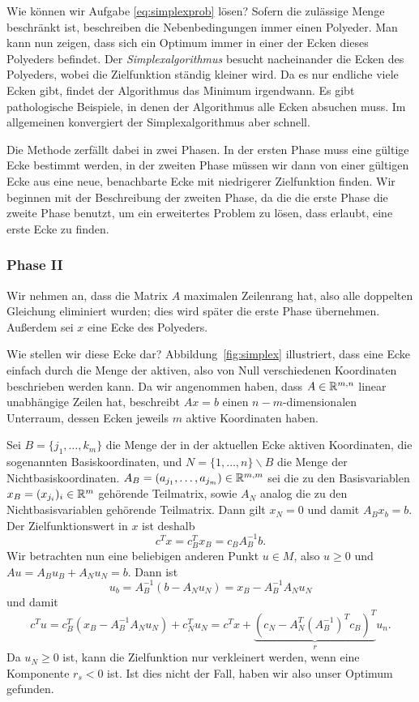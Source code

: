 Wie können wir Aufgabe \eqref{eq:simplexprob} lösen? Sofern die
zulässige Menge beschränkt ist, beschreiben die Nebenbedingungen immer
einen Polyeder. Man kann nun zeigen, dass sich ein Optimum immer in
einer der Ecken dieses Polyeders befindet. Der
\emph{Simplexalgorithmus} besucht nacheinander die Ecken des
Polyeders, wobei die Zielfunktion ständig kleiner wird. Da es nur
endliche viele Ecken gibt, findet der Algorithmus das Minimum
irgendwann. Es gibt pathologische Beispiele, in denen der Algorithmus
alle Ecken absuchen muss. Im allgemeinen konvergiert der
Simplexalgorithmus aber schnell.

Die Methode zerfällt dabei in zwei Phasen. In der ersten Phase muss
eine gültige Ecke bestimmt werden, in der zweiten Phase müssen wir
dann von einer gültigen Ecke aus eine neue, benachbarte Ecke mit
niedrigerer Zielfunktion finden. Wir beginnen mit der Beschreibung der
zweiten Phase, da die die erste Phase die zweite Phase benutzt, um ein
erweitertes Problem zu lösen, dass erlaubt, eine erste Ecke zu finden.

\subsubsection*{Phase II}

Wir nehmen an, dass die Matrix $A$ maximalen Zeilenrang hat, also alle
doppelten Gleichung eliminiert wurden; dies wird später die erste
Phase übernehmen.  Außerdem sei $x$ eine Ecke des Polyeders.

Wie stellen wir diese Ecke dar? Abbildung~\ref{fig:simplex}
illustriert, dass eine Ecke einfach durch die Menge der aktiven, also
von Null verschiedenen Koordinaten beschrieben werden kann. Da wir
angenommen haben, dass $A\in\mathbb{R}^{m,n}$ linear unabhängige Zeilen hat,
beschreibt $Ax=b$ einen $n-m$-dimensionalen Unterraum, dessen Ecken
jeweils $m$ aktive Koordinaten haben.

Sei $B=\{j_1,\ldots,k_m\}$ die Menge der in der aktuellen Ecke aktiven
Koordinaten, die sogenannten Basiskoordinaten, und
$N=\{1,\ldots,n\}\backslash B$ die Menge der
Nichtbasiskoordinaten. $A_B = (a_{j_1},\ldots,a_{j_m})\in\mathbb{R}^{m,m}$
sei die zu den Basisvariablen $x_B = (x_{j_i})_i\in\mathbb{R}^m$ gehörende
Teilmatrix, sowie $A_N$ analog die zu den Nichtbasisvariablen
gehörende Teilmatrix. Dann gilt $x_N=0$ und damit $A_Bx_b = b$.
Der Zielfunktionswert in $x$ ist deshalb
\begin{equation}
  c^Tx = c_B^Tx_B = c_BA_B^{-1}b.
\end{equation}
Wir betrachten nun eine beliebigen anderen Punkt $u\in M$, also $u\ge
0$ und $Au=A_Bu_B + A_Nu_N = b$. Dann ist
\begin{equation}
  \label{eq:simplexub}
  u_b = A_B^{-1}(b - A_Nu_N) = x_B - A_B^{-1}A_Nu_N
\end{equation}
und damit
\begin{equation}
  c^Tu = c_B^T(x_B - A_B^{-1}A_Nu_N) + c_N^Tu_N = c^Tx +
  \underbrace{\left(c_N - A_N^T\left(A_B^{-1}\right)^Tc_B\right)^T}_{r}u_n.
\end{equation}
Da $u_N\ge 0$ ist, kann die Zielfunktion nur verkleinert werden, wenn
eine Komponente $r_s < 0$ ist. Ist dies nicht der Fall, haben wir also
unser Optimum gefunden.

